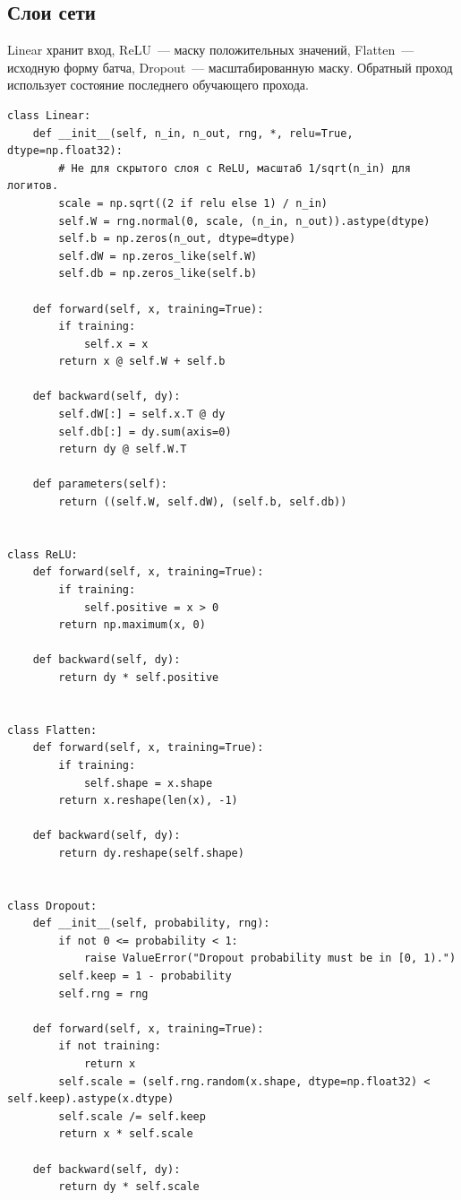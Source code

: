 \subsection{Слои сети}
Linear хранит вход, ReLU~--- маску положительных значений, Flatten~--- исходную форму батча, Dropout~--- масштабированную маску. Обратный проход использует состояние последнего обучающего прохода.
{\codefont
\begin{verbatim}
class Linear:
    def __init__(self, n_in, n_out, rng, *, relu=True, dtype=np.float32):
        # He для скрытого слоя с ReLU, масштаб 1/sqrt(n_in) для логитов.
        scale = np.sqrt((2 if relu else 1) / n_in)
        self.W = rng.normal(0, scale, (n_in, n_out)).astype(dtype)
        self.b = np.zeros(n_out, dtype=dtype)
        self.dW = np.zeros_like(self.W)
        self.db = np.zeros_like(self.b)

    def forward(self, x, training=True):
        if training:
            self.x = x
        return x @ self.W + self.b

    def backward(self, dy):
        self.dW[:] = self.x.T @ dy
        self.db[:] = dy.sum(axis=0)
        return dy @ self.W.T

    def parameters(self):
        return ((self.W, self.dW), (self.b, self.db))


class ReLU:
    def forward(self, x, training=True):
        if training:
            self.positive = x > 0
        return np.maximum(x, 0)

    def backward(self, dy):
        return dy * self.positive


class Flatten:
    def forward(self, x, training=True):
        if training:
            self.shape = x.shape
        return x.reshape(len(x), -1)

    def backward(self, dy):
        return dy.reshape(self.shape)


class Dropout:
    def __init__(self, probability, rng):
        if not 0 <= probability < 1:
            raise ValueError("Dropout probability must be in [0, 1).")
        self.keep = 1 - probability
        self.rng = rng

    def forward(self, x, training=True):
        if not training:
            return x
        self.scale = (self.rng.random(x.shape, dtype=np.float32) < self.keep).astype(x.dtype)
        self.scale /= self.keep
        return x * self.scale

    def backward(self, dy):
        return dy * self.scale
\end{verbatim}
}

